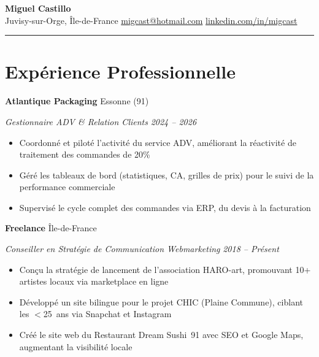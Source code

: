 \documentclass[10pt,letterpaper]{article}
\newcommand{\entry}[4]{%
  \noindent\textbf{#1} \hfill #2 \par\nopagebreak
  \textit{#3} \hfill \textit{#4} \par\nopagebreak
}
\begin{document}
\begin{center}
  {\LARGE\bfseries Miguel Castillo} \\[3pt]
  \enspace Juvisy-sur-Orge, \^Ile-de-France
  \quad{}\enspace \href{mailto:migcast@hotmail.com}{migcast@hotmail.com}
  \quad{}\enspace \href{https://www.linkedin.com/in/migcast/}{linkedin.com/in/migcast}
\end{center}

\vspace{-0.4em}
\noindent\rule{\textwidth}{0.8pt}
\vspace{-0.6em}

\section{Exp\'erience Professionnelle}

\entry{Atlantique Packaging}{Essonne (91)}{Gestionnaire ADV \& Relation Clients}{2024 -- 2026}
\begin{itemize}
  \item Coordonn\'e et pilot\'e l'activit\'e du service ADV, am\'eliorant la r\'eactivit\'e de traitement des commandes de 20\%
  \item G\'er\'e les tableaux de bord (statistiques, CA, grilles de prix) pour le suivi de la performance commerciale
  \item Supervis\'e le cycle complet des commandes via ERP, du devis \`a la facturation
\end{itemize}
\vspace{0.2em}

\entry{Freelance}{\^Ile-de-France}{Conseiller en Strat\'egie de Communication Webmarketing}{2018 -- Pr\'esent}
\begin{itemize}
  \item Con\c{c}u la strat\'egie de lancement de l'association HARO-art, promouvant 10+ artistes locaux via marketplace en ligne
  \item D\'evelopp\'e un site bilingue pour le projet CHIC (Plaine Commune), ciblant les $<$25~ans via Snapchat et Instagram
  \item Cr\'e\'e le site web du Restaurant Dream Sushi~91 avec SEO et Google Maps, augmentant la visibilit\'e locale
\end{itemize}
\vspace{0.2em}
\end{document}
